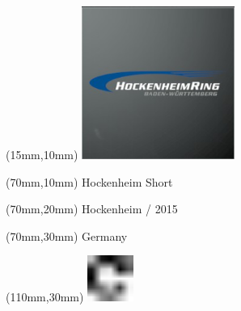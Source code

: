 \null\newpage
\begin{textblock*}{50mm}(15mm,10mm)%
\includegraphics[width=50mm]{LG/2015-05-20_00082.png}
\end{textblock*}
\begin{textblock*}{130mm}(70mm,10mm)%
{\fontsize{20}{20}\selectfont Hockenheim Short}\\
\end{textblock*}
\begin{textblock*}{120mm}(70mm,20mm)%
{\fontsize{16}{16}\selectfont Hockenheim / 2015}\\
\end{textblock*}
\begin{textblock*}{120mm}(70mm,30mm)%
{\fontsize{12}{12}\selectfont Germany}
\end{textblock*}
\begin{textblock*}{30mm}(110mm,30mm)%
\centering
\includegraphics[height=15mm]{icons/fa-rotate-right.pdf}
\end{textblock*}
